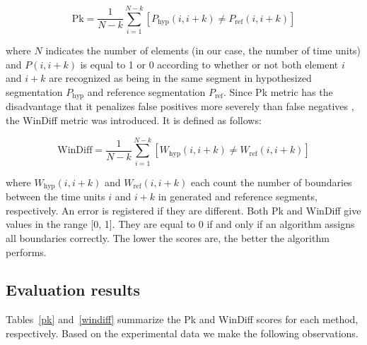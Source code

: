 \documentclass[output=paper]{langsci/langscibook}
\begin{document}
\begin{equation}\tag{12}
\text{Pk} = \frac{1}{N - k}\sum_{i = 1}^{N - k}[P_{\text{hyp}}(i, i + k) \neq P_{\text{ref}}(i, i + k)]
\end{equation}

where $N$ indicates the number of elements (in our case, the number of time units) and $P(i, i + k)$ is equal to 1 or 0 according to whether or not both element $i$ and $i + k$ are recognized as being in the same segment in hypothesized segmentation $P_{\text{hyp}}$ and reference segmentation $P_{\text{ref}}$. Since Pk metric has the disadvantage that it penalizes false positives more severely than false negatives \citep{alemi2015text}, the WinDiff metric was introduced. It is defined as follows:

\begin{equation}\tag{13}
\text{WinDiff} = \frac{1}{N - k}\sum_{i = 1}^{N - k}[W_{\text{hyp}}(i, i + k) \neq W_{\text{ref}}(i, i + k)]
\end{equation}

where $W_{\text{hyp}}(i, i + k)$ and $W_{\text{ref}}(i, i + k)$ each count the number of boundaries between the time units $i$ and $i + k$ in generated and reference segments, respectively. An error is registered if they are different. Both Pk and WinDiff give values in the range [0, 1]. They are equal to 0 if and only if an algorithm assigns all boundaries correctly. The lower the scores are, the better the algorithm performs. 

\subsection{Evaluation results}
Tables~\ref{pk} and~\ref{windiff} summarize the Pk and WinDiff scores for each method, respectively. Based on the experimental data we make the following observations.
\end{document}
